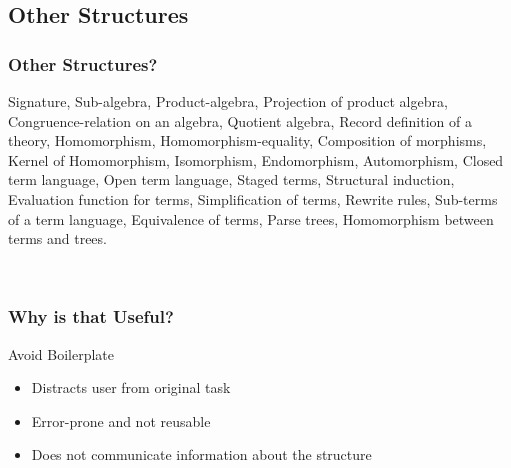 \documentclass[t,12pt,numbers,fleqn,usenames,xcolor=dvipsnames]{beamer}
\begin{document}

\subsection{Other Structures}
\begin{frame}
\frametitle{Other Structures?}
\vspace{0.15cm}
{\scriptsize
	Signature, Sub-algebra, Product-algebra, Projection of product algebra, Congruence-relation on 
	an algebra, Quotient algebra, Record definition of a theory, Homomorphism, 
	Homomorphism-equality, Composition of morphisms, Kernel of Homomorphism, Isomorphism, 
	Endomorphism, Automorphism, Closed term language, Open term language, Staged terms, 
	Structural induction, Evaluation function for terms, Simplification of terms, Rewrite rules, 
	Sub-terms of a term language, Equivalence of terms, Parse trees, Homomorphism between 
	terms and trees. 
}

\vspace{0.3cm}
\pause
{}
\
\end{frame}

\begin{frame}
\frametitle{Why is that Useful?}
Avoid Boilerplate 
\begin{itemize}
	\item Distracts user from original task 
	\item Error-prone and not reusable 
	\item Does not communicate information about the structure 
\end{itemize}
\end{frame}
\end{document}

